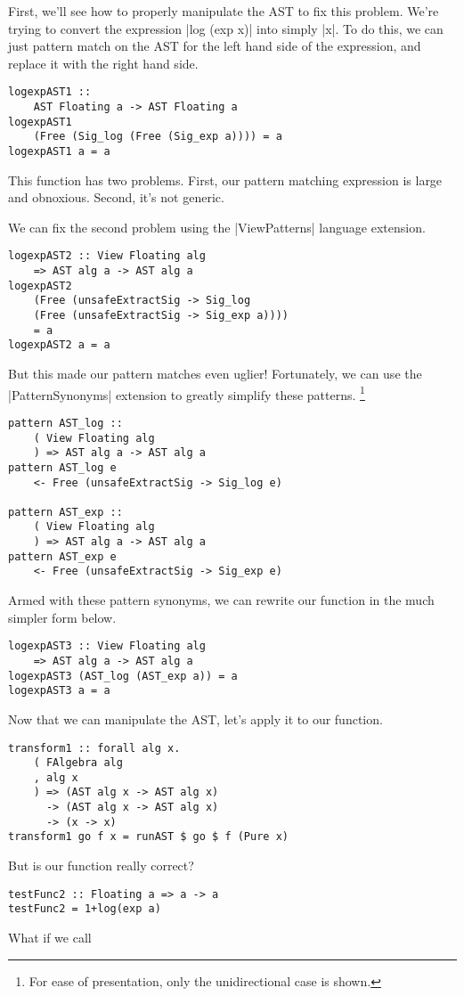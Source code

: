\documentclass[preprint]{sigplanconf}
\theoremstyle{definition}
\begin{document}
First, we'll see how to properly manipulate the AST to fix this problem.
We're trying to convert the expression |log (exp x)| into simply |x|.
To do this, we can just pattern match on the AST for the left hand side of the expression,
and replace it with the right hand side.
\begin{lstlisting}
logexpAST1 ::
    AST Floating a -> AST Floating a
logexpAST1
    (Free (Sig_log (Free (Sig_exp a)))) = a
logexpAST1 a = a
\end{lstlisting}
This function has two problems.
First, our pattern matching expression is large and obnoxious.
Second, it's not generic.

We can fix the second problem using the |ViewPatterns| language extension.
\begin{lstlisting}
logexpAST2 :: View Floating alg
    => AST alg a -> AST alg a
logexpAST2
    (Free (unsafeExtractSig -> Sig_log
    (Free (unsafeExtractSig -> Sig_exp a))))
    = a
logexpAST2 a = a
\end{lstlisting}
But this made our pattern matches even uglier!
Fortunately, we can use the |PatternSynonyms| extension to greatly simplify these patterns.
\footnote{
    For ease of presentation, only the unidirectional case is shown.
}
\begin{lstlisting}
pattern AST_log ::
    ( View Floating alg
    ) => AST alg a -> AST alg a
pattern AST_log e
    <- Free (unsafeExtractSig -> Sig_log e)

pattern AST_exp ::
    ( View Floating alg
    ) => AST alg a -> AST alg a
pattern AST_exp e
    <- Free (unsafeExtractSig -> Sig_exp e)
\end{lstlisting}
Armed with these pattern synonyms, we can rewrite our function in the much simpler form below.
\begin{lstlisting}
logexpAST3 :: View Floating alg
    => AST alg a -> AST alg a
logexpAST3 (AST_log (AST_exp a)) = a
logexpAST3 a = a
\end{lstlisting}
Now that we can manipulate the AST, let's apply it to our function.
\begin{lstlisting}
transform1 :: forall alg x.
    ( FAlgebra alg
    , alg x
    ) => (AST alg x -> AST alg x)
      -> (AST alg x -> AST alg x)
      -> (x -> x)
transform1 go f x = runAST $ go $ f (Pure x)
\end{lstlisting}


But is our function really correct?
\begin{lstlisting}
testFunc2 :: Floating a => a -> a
testFunc2 = 1+log(exp a)
\end{lstlisting}
What if we call
\end{document}
